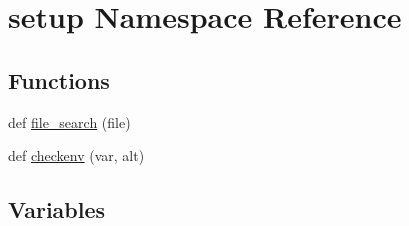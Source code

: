 \hypertarget{namespacesetup}{}\section{setup Namespace Reference}
\label{namespacesetup}
\subsection*{Functions}
\begin{DoxyCompactItemize}
\item 
def \hyperlink{namespacesetup_a98c11c98a822ccbe47d135174bfcc346}{file\+\_\+search} (file)
\item 
def \hyperlink{namespacesetup_a3477c4ce4216a75efaf147946c414f4f}{checkenv} (var, alt)
\end{DoxyCompactItemize}
\subsection*{Variables}

